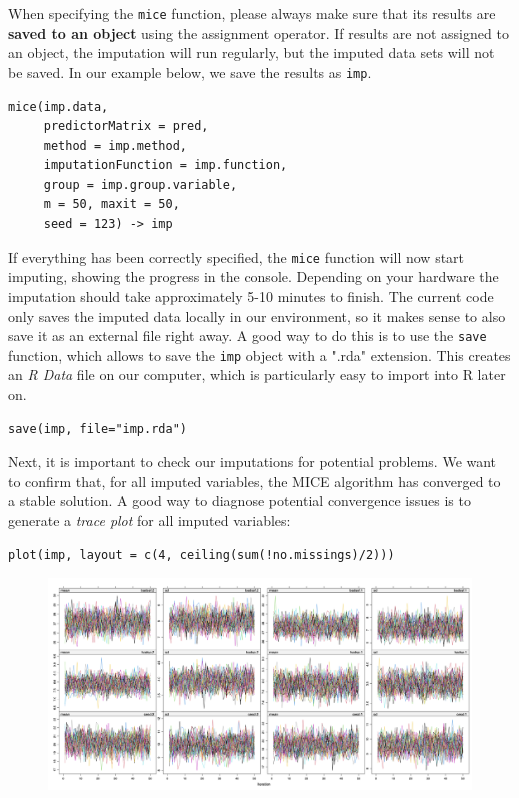 \begin{box-important}

When specifying the \texttt{mice} function, please always make sure that its results are \textcolor{burgundyred}{\textbf{saved to an object}} using the assignment operator. If results are not assigned to an object, the imputation will run regularly, but the imputed data sets will not be saved. In our example below, we save the results as \texttt{imp}.

\end{box-important}

\begin{lstlisting}
mice(imp.data,
     predictorMatrix = pred,
     method = imp.method,
     imputationFunction = imp.function,
     group = imp.group.variable,
     m = 50, maxit = 50,
     seed = 123) -> imp
\end{lstlisting}

If everything has been correctly specified, the \texttt{mice} function will now start imputing, showing the progress in the console. Depending on your hardware the imputation should take approximately 5-10 minutes to finish. The current code only saves the imputed data locally in our environment, so it makes sense to also save it as an external file right away. A good way to do this is to use the \texttt{save} function, which allows to save the \texttt{imp} object with a ".rda" extension. This creates an \emph{R Data} file on our computer, which is particularly easy to import into \textsf{R} later on. 

\begin{lstlisting}
save(imp, file="imp.rda")
\end{lstlisting}

Next, it is important to check our imputations for potential problems. We want to confirm that, for all imputed variables, the \textsf{MICE} algorithm has converged to a stable solution. A good way to diagnose potential convergence issues is to generate a \emph{trace plot} for all imputed variables:

\begin{lstlisting}
plot(imp, layout = c(4, ceiling(sum(!no.missings)/2)))
\end{lstlisting}


\begin{figure}[H]
\includegraphics[width=13cm]{images/traceplot.png}
\centering
\end{figure}

